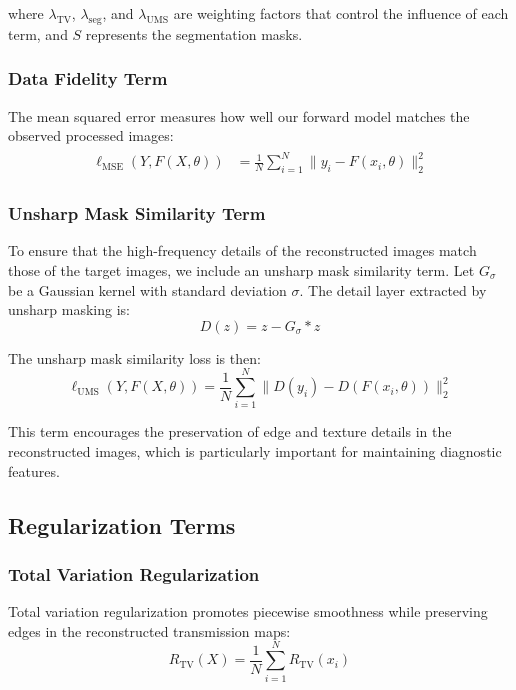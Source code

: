 \documentclass[nomenclature, english, bibtex]{kththesis}
\numberwithin{listing}{chapter}
\begin{document}
where $\lambda_{\text{TV}}$, $\lambda_{\text{seg}}$, and $\lambda_{\text{UMS}}$ are weighting factors that control the influence of each term, and $S$ represents the segmentation masks.

\subsubsection{Data Fidelity Term}
The mean squared error measures how well our forward model matches the observed processed images:
\begin{align}
    \begin{split}
\ell_{\text{MSE}}(Y, F(X, \theta)) &= \frac{1}{N} \sum_{i=1}^N \|y_i - F(x_i, \theta)\|_2^2
    \end{split}
\end{align}

\subsubsection{Unsharp Mask Similarity Term}
To ensure that the high-frequency details of the reconstructed images match those of the target images, we include an unsharp mask similarity term. Let $G_\sigma$ be a Gaussian kernel with standard deviation $\sigma$. The detail layer extracted by unsharp masking is:
\begin{equation}
D(z) = z - G_\sigma * z
\end{equation}

The unsharp mask similarity loss is then:
\begin{equation}
\ell_{\text{UMS}}(Y, F(X, \theta)) = \frac{1}{N} \sum_{i=1}^N \|D(y_i) - D(F(x_i, \theta))\|_2^2
\end{equation}

This term encourages the preservation of edge and texture details in the reconstructed images, which is particularly important for maintaining diagnostic features.

\subsection{Regularization Terms}

\subsubsection{Total Variation Regularization}
Total variation regularization promotes piecewise smoothness while preserving edges in the reconstructed transmission maps:
\begin{equation}
R_{\text{TV}}(X) = \frac{1}{N} \sum_{i=1}^N R_{\text{TV}}(x_i)
\end{equation}
\end{document}
